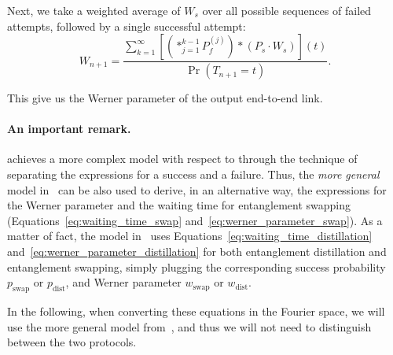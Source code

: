 \documentclass{masterthesis}
\begin{document}
Next, we take a weighted average of $W_s$ over all possible sequences of failed attempts, followed by a single successful attempt:
\begin{equation}\label{eq:werner_parameter_distillation}
    W_{n+1} = \frac{\sum_{k=1}^{\infty} \left[ \left( \ast_{j=1}^{k-1} P_f^{(j)} \right) \ast (P_s \cdot W_s) \right] (t)}{\Pr(T_{n+1} = t)}.
\end{equation}

This give us the Werner parameter of the output end-to-end link.

\paragraph*{An important remark.} \textcite{Li_2021} achieves a more complex model with respect to \textcite{Brand_2020} through the technique of separating the expressions for a success and a failure. Thus, the \textit{more general} model in~\cite{Li_2021} can be also used to derive, in an alternative way, the expressions for the Werner parameter and the waiting time for entanglement swapping (Equations~\ref{eq:waiting_time_swap} and~\ref{eq:werner_parameter_swap}).
As a matter of fact, the model in~\cite{Li_2021} uses Equations~\ref{eq:waiting_time_distillation} and~\ref{eq:werner_parameter_distillation} for both entanglement distillation and entanglement swapping, simply plugging the corresponding success probability $p_\text{swap}$ or $p_\text{dist}$, and Werner parameter $w_\text{swap}$ or $w_\text{dist}$.

In the following, when converting these equations in the Fourier space, we will use the more general model from~\cite{Li_2021}, and thus we will not need to distinguish between the two protocols.




\end{document}
